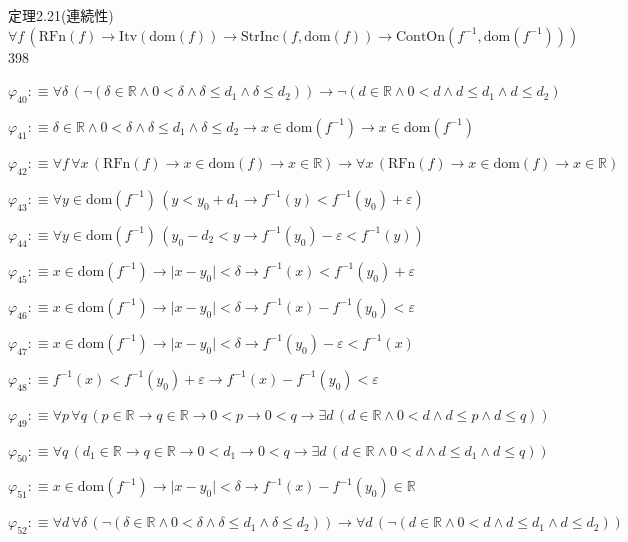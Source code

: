 \begin{fullproof}{定理2.21(連続性)}{$\forall f\,(\mathrm{RFn}(f) \to \mathrm{Itv}(\mathrm{dom}(f)) \to \mathrm{StrInc}(f,\mathrm{dom}(f)) \to \mathrm{ContOn}(f^{-1},\mathrm{dom}(f^{-1})))$}{398}
\begin{abbrevlist}
\item $\varphi_{40} :\equiv \forall \delta\,(\neg (\delta \in \mathbb{R} \land 0 < \delta \land \delta \leq d_{1} \land \delta \leq d_{2})) \to \neg (d \in \mathbb{R} \land 0 < d \land d \leq d_{1} \land d \leq d_{2})$
\item $\varphi_{41} :\equiv \delta \in \mathbb{R} \land 0 < \delta \land \delta \leq d_{1} \land \delta \leq d_{2} \to x \in \mathrm{dom}(f^{-1}) \to x \in \mathrm{dom}(f^{-1})$
\item $\varphi_{42} :\equiv \forall f\,\forall x\,(\mathrm{RFn}(f) \to x \in \mathrm{dom}(f) \to x \in \mathbb{R}) \to \forall x\,(\mathrm{RFn}(f) \to x \in \mathrm{dom}(f) \to x \in \mathbb{R})$
\item $\varphi_{43} :\equiv \forall y \in \mathrm{dom}(f^{-1})\,(y < y_{0} + d_{1} \to f^{-1}(y) < f^{-1}(y_{0}) + \varepsilon)$
\item $\varphi_{44} :\equiv \forall y \in \mathrm{dom}(f^{-1})\,(y_{0} - d_{2} < y \to f^{-1}(y_{0}) - \varepsilon < f^{-1}(y))$
\item $\varphi_{45} :\equiv x \in \mathrm{dom}(f^{-1}) \to \lvert x - y_{0} \rvert < \delta \to f^{-1}(x) < f^{-1}(y_{0}) + \varepsilon$
\item $\varphi_{46} :\equiv x \in \mathrm{dom}(f^{-1}) \to \lvert x - y_{0} \rvert < \delta \to f^{-1}(x) - f^{-1}(y_{0}) < \varepsilon$
\item $\varphi_{47} :\equiv x \in \mathrm{dom}(f^{-1}) \to \lvert x - y_{0} \rvert < \delta \to f^{-1}(y_{0}) - \varepsilon < f^{-1}(x)$
\item $\varphi_{48} :\equiv f^{-1}(x) < f^{-1}(y_{0}) + \varepsilon \to f^{-1}(x) - f^{-1}(y_{0}) < \varepsilon$
\item $\varphi_{49} :\equiv \forall p\,\forall q\,(p \in \mathbb{R} \to q \in \mathbb{R} \to 0 < p \to 0 < q \to \exists d\,(d \in \mathbb{R} \land 0 < d \land d \leq p \land d \leq q))$
\item $\varphi_{50} :\equiv \forall q\,(d_{1} \in \mathbb{R} \to q \in \mathbb{R} \to 0 < d_{1} \to 0 < q \to \exists d\,(d \in \mathbb{R} \land 0 < d \land d \leq d_{1} \land d \leq q))$
\item $\varphi_{51} :\equiv x \in \mathrm{dom}(f^{-1}) \to \lvert x - y_{0} \rvert < \delta \to f^{-1}(x) - f^{-1}(y_{0}) \in \mathbb{R}$
\item $\varphi_{52} :\equiv \forall d\,\forall \delta\,(\neg (\delta \in \mathbb{R} \land 0 < \delta \land \delta \leq d_{1} \land \delta \leq d_{2})) \to \forall d\,(\neg (d \in \mathbb{R} \land 0 < d \land d \leq d_{1} \land d \leq d_{2}))$

\end{abbrevlist}
\end{fullproof}
